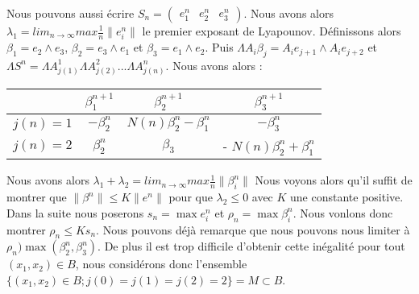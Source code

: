 \documentclass[12pt]{article}
\theoremstyle{plain}%
\theoremstyle{definition}
\theoremstyle{remark}
\begin{document}
Nous pouvons aussi écrire $S_n=\begin{pmatrix} e_1^n & e_2^n & e_3^n\end{pmatrix}$.
 Nous avons alors $\lambda_1= lim_{n\to \infty} max \frac{1}{n}\|e_i^n\|$ le premier exposant de Lyapounov.\newline
 Définissons alors $\beta_1=e_2 \land e_3$, $\beta_2=e_3 \land e_1$ et $\beta_3=e_1 \land e_2$.
 Puis $\Lambda A_i \beta_j=A_i e_{j+1} \land A_i e_{j+2}$ et $\Lambda S^n=\Lambda A_{j(1)}^1  \Lambda A_{j(2)}^2 ... \Lambda A_{j(n)}^n$. \newline
 Nous avons alors :
  \begin{tabular}{c|c|c|c|}
    & $\beta_1^{n+1}$ & $\beta_2^{n+1}$ & $\beta_3^{n+1}$\\
  \hline
  $j(n)=1$ & $-\beta_2^{n}$ & $N(n) \beta_2^n-\beta_1^n$ & $-\beta_3^n$ \\
  $j(n)=2$ & $\beta_2^{n}$ & $\beta_3$ & - $N(n) \beta_2^n+\beta_1^n$ \\
  \end{tabular}
  Nous avons alors $\lambda_1 + \lambda_2= lim_{n\to \infty} max \frac{1}{n}\|\beta_i^n\|$ \newline
  Nous voyons alors qu'il suffit de montrer que $\|\beta^n\| \leq K \|e^n\|$ pour que $\lambda_2 \leq 0$ avec $K$ une constante positive. \newline
  Dans la suite nous poserons $s_n= \max e_i^n$ et $\rho_n=\max \beta_i^n$. Nous vonlons donc montrer $\rho_n \leq K s_n$.\newline
  Nous pouvons déjà remarque que nous pouvons nous limiter à $\rho_n) \max{(\beta_2^n, \beta_3^n)}$. De plus il est trop difficile d'obtenir cette inégalité pour tout $(x_1,x_2) \in B$, nous considérons donc l'ensemble $\{(x_1,x_2)\in B;j(0)=j(1)=j(2)=2\}=M \subset B$.
\end{document}
